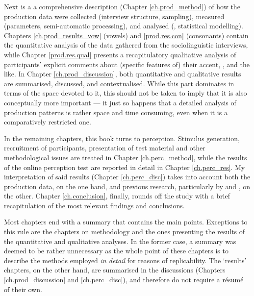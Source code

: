 Next is a a comprehensive description (Chapter \ref{ch.prod_method}) of how the production data were collected (interview structure, sampling), measured (parameters, semi-automatic processing), and analysed (, statistical modelling).
Chapters \ref{ch.prod_results_vow} (vowels) and \ref{prod.res.con} (consonants) contain the quantitative analysis of the data gathered from the sociolinguistic interviews, while Chapter \ref{prod.res.qual} presents a recapitulatory qualitative analysis of participants' explicit comments about (specific features of) their accent, , and the like.
In Chapter \ref{ch.prod_discussion}, both quantitative and qualitative results are summarised, discussed, and contextualised.
While this part dominates in terms of the space devoted to it, this should not be taken to imply that it is also conceptually more important --- it just so happens that a detailed analysis of production patterns is rather space and time consuming, even when it is a comparatively restricted one.

In the remaining chapters, this book turns to perception.
Stimulus generation, recruitment of participants, presentation of test material and other methodological issues are treated in Chapter \ref{ch.perc_method}, while the results of the online perception test are reported in detail in Chapter \ref{ch.perc_res}.
My interpretation of said results (Chapter \ref{ch.perc_disc}) takes into account both the production data, on the one hand, and previous research, particularly by \textcite{hayetal2006a} and \textcite{haydrager2010}, on the other.
Chapter \ref{ch.conclusion}, finally, rounds off the study with a brief recapitulation of the most relevant findings and conclusions.

Most chapters end with a summary that contains the main points.
Exceptions to this rule are the chapters on methodology and the ones presenting the results of the quantitative and qualitative analyses.
In the former case, a summary was deemed to be rather unnecessary as the whole point of these chapters is to describe the methods employed \emph{in detail} for reasons of replicability.
The `results' chapters, on the other hand, are summarised in the discussions (Chapters \ref{ch.prod_discussion} and \ref{ch.perc_disc}), and therefore do not require a résumé of their own.